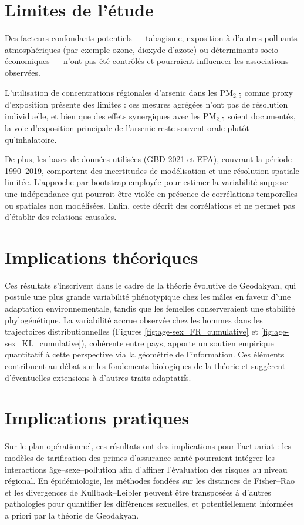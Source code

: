 \section{Limites de l'étude}

Des facteurs confondants potentiels — tabagisme, exposition à d'autres polluants atmosphériques (par exemple ozone, dioxyde d'azote) ou déterminants socio-économiques — n'ont pas été contrôlés et pourraient influencer les associations observées. 

L'utilisation de concentrations régionales d'arsenic dans les PM$_{2,5}$ comme proxy d'exposition présente des limites : ces mesures agrégées n'ont pas de résolution individuelle, et bien que des effets synergiques avec les PM$_{2,5}$ soient documentés, la voie d'exposition principale de l'arsenic reste souvent orale plutôt qu'inhalatoire.

De plus, les bases de données utilisées (GBD-2021 et EPA), couvrant la période 1990–2019, comportent des incertitudes de modélisation et une résolution spatiale limitée. L'approche par bootstrap employée pour estimer la variabilité suppose une indépendance qui pourrait être violée en présence de corrélations temporelles ou spatiales non modélisées. Enfin, cette décrit des corrélations et ne permet pas d'établir des relations causales.

\section{Implications théoriques}

Ces résultats s'inscrivent dans le cadre de la théorie évolutive de Geodakyan, qui postule une plus grande variabilité phénotypique chez les mâles en faveur d'une adaptation environnementale, tandis que les femelles conserveraient une stabilité phylogénétique. La variabilité accrue observée chez les hommes dans les trajectoires distributionnelles (Figures \ref{fig:age-sex_FR_cumulative} et \ref{fig:age-sex_KL_cumulative}), cohérente entre pays, apporte un soutien empirique quantitatif à cette perspective via la géométrie de l'information. Ces éléments contribuent au débat sur les fondements biologiques de la théorie et suggèrent d'éventuelles extensions à d'autres traits adaptatifs.

\section{Implications pratiques}

Sur le plan opérationnel, ces résultats ont des implications pour l'actuariat : les modèles de tarification des primes d'assurance santé pourraient intégrer les interactions âge–sexe–pollution afin d'affiner l'évaluation des risques au niveau régional. En épidémiologie, les méthodes fondées sur les distances de Fisher–Rao et les divergences de Kullback–Leibler peuvent être transposées à d'autres pathologies pour quantifier les différences sexuelles, et potentiellement informées a priori par la théorie de Geodakyan.

